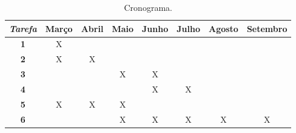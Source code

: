 \begin{table}
\begin{center}
\begin{small}
\begin{tabular}{|c|c|c|c|c|c|c|c|} 
\hline
\emph{Tarefa} &
Março & 
Abril & 
Maio &  
Junho & 
Julho &
Agosto & 
Setembro \\ \hline
\textbf{1} & X &  &  &  &  &  &  \\ \hline 
\textbf{2} & X & X &  &  &  &  &  \\ \hline 
\textbf{3} &  &  & X & X &  &  &  \\ \hline 
\textbf{4} &  &  &  & X & X &  &  \\ \hline 
\textbf{5} & X & X & X &  &  &  &  \\ \hline 
\textbf{6} &  &  & X & X & X & X & X \\ \hline 
\end{tabular}
\caption{Cronograma.}
\label{tab:tab:F5}
\end{small}
\end{center}
\end{table}